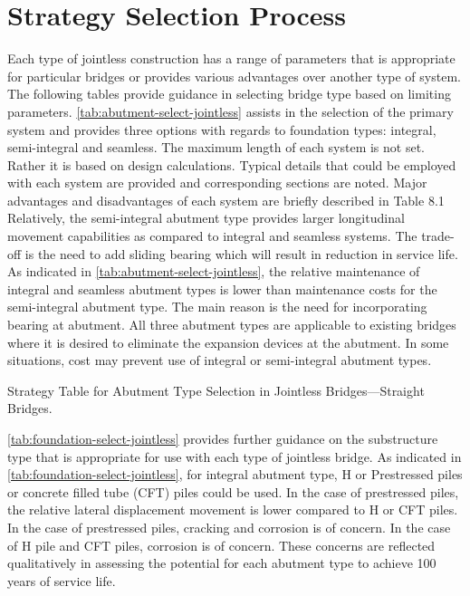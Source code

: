 \section{Strategy Selection Process}
Each type of jointless construction has a range of parameters that is appropriate for particular bridges or provides
various advantages over another type of system. The following tables provide guidance in selecting bridge type based
on limiting parameters. \cref{tab:abutment-select-jointless} assists in the selection of the primary system and provides three options with regards to foundation types: integral, semi-integral and seamless. The maximum length of each system is not set.
Rather it is based on design calculations. Typical details that could be employed with each system are provided and
corresponding sections are noted. Major advantages and disadvantages of each system are briefly described in Table
8.1 Relatively, the semi-integral abutment type provides larger longitudinal movement capabilities as compared to
integral and seamless systems. The trade-off is the need to add sliding bearing which will result in reduction in service
life. As indicated in \cref{tab:abutment-select-jointless}, the relative maintenance of integral and seamless abutment types is lower than
maintenance costs for the semi-integral abutment type. The main reason is the need for incorporating bearing at
abutment. All three abutment types are applicable to existing bridges where it is desired to eliminate the expansion
devices at the abutment. In some situations, cost may prevent use of integral or semi-integral abutment types.

\begin{table}
  \caption{Strategy Table for Abutment Type Selection in Jointless Bridges—Straight Bridges.}\label{tab:abutment-select-jointless}
\end{table}

\cref{tab:foundation-select-jointless} provides further guidance on the substructure type that is appropriate for use with each type of jointless
bridge. As indicated in \cref{tab:foundation-select-jointless}, for integral abutment type, H or Prestressed piles or concrete filled tube (CFT) piles
could be used. In the case of prestressed piles, the relative lateral displacement movement is lower compared to H or
CFT piles. In the case of prestressed piles, cracking and corrosion is of concern. In the case of H pile and CFT piles,
corrosion is of concern. These concerns are reflected qualitatively in assessing the potential for each abutment type to
achieve 100 years of service life.

